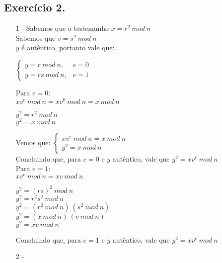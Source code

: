 \documentclass[12pt]{article}
\begin{document}
	\subsection*{Exercício 2.}
		\begin{itemize}
			\item[1 -]
				Sabemos que o testemunho $x = r^2 \ mod \ n $\\
				Sabemos que $v = s^2 \ mod \ n$\\
				$y$ é autêntico, portanto vale que:
				\begin{center}								
					$ \begin{cases} 
					y = r \ mod \ n, & e = 0 \\ 
					y = rs \ mod \ n, & e = 1
					\end{cases}
					$
				\end{center}
				Para $e = 0$:\\
				$xv^{e} \ mod \ n = xv^{0} \ mod \ n = x \ mod \ n$\\
				\begin{center} 
					$y^2 = r^2 \ mod \ n$\\
					$y^2 = x \ mod \ n$\\
				\end{center}
				Vemos que:
				$ \begin{cases} 
					xv^{e} \ mod \ n =  x \ mod \ n \\ y^2 = x \ mod \ n
					\end{cases}
				$\\
				Concluindo que, para $e = 0$ e $y$ autêntico, vale que $y^2 = xv^{e} \
				mod \ n$\\
				\newline
				Para $e = 1$:\\
				$xv^{e} \ mod \ n = xv \ mod \ n$\\
				\begin{center} 
					$y^2 = (rs)^2 \ mod \ n$\\
					$y^2 = r^2s^2 \ mod \ n$\\
					$y^2 = (r^2 \ mod \ n) \ (s^2 \ mod \ n)$\\
					$y^2 = (x \ mod \ n) \ (v \ mod \ n)$\\
					$y^2 = xv \ mod \ n$\\					
				\end{center}
				Concluindo que, para $e = 1$ e $y$ autêntico, vale que $y^2 = xv^{e} \
				mod \ n$
			\item[2 -]					
		\end{itemize}
\end{document}
